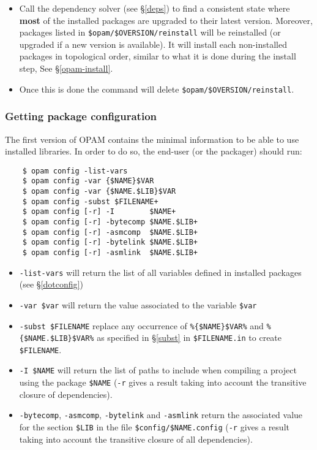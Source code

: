 \documentclass[a4paper,11pt]{article}
\begin{document}
\begin{itemize}

\item Call the dependency solver (see \S\ref{deps}) to
find a consistent state where {\bf most} of the installed packages are
upgraded to their latest version. Moreover, packages listed in
\verb+$opam/$OVERSION/reinstall+ will be reinstalled (or upgraded if a new
version is available). It will install each non-installed packages in
topological order, similar to what it is done during the install step,
See \S\ref{opam-install}.

\item Once this is done the command will delete
  \verb+$opam/$OVERSION/reinstall+.

\end{itemize}

\subsubsection{Getting package configuration}
\label{opam-config}

The first version of OPAM contains the minimal information to be able
to use installed libraries. In order to do so, the end-user (or the
packager) should run:

\begin{verbatim}
    $ opam config -list-vars
    $ opam config -var {$NAME}$VAR
    $ opam config -var {$NAME.$LIB}$VAR
    $ opam config -subst $FILENAME+
    $ opam config [-r] -I        $NAME+
    $ opam config [-r] -bytecomp $NAME.$LIB+
    $ opam config [-r] -asmcomp  $NAME.$LIB+
    $ opam config [-r] -bytelink $NAME.$LIB+
    $ opam config [-r] -asmlink  $NAME.$LIB+
\end{verbatim}

\begin{itemize}
\item \verb+-list-vars+ will return the list of all variables defined
  in installed packages (see \S\ref{dotconfig})
\item \verb+-var $var+ will return the value associated to the
  variable \verb+$var+
\item \verb+-subst $FILENAME+ replace any occurrence of
  \verb+%{$NAME}$VAR%+ and \verb+%{$NAME.$LIB}$VAR%+ as specified in
  \S\ref{subst} in \verb+$FILENAME.in+ to create \verb+$FILENAME+.
\item \verb+-I $NAME+ will return the list of paths to include when
  compiling a project using the package \verb+$NAME+ (\verb+-r+ gives
  a result taking into account the transitive closure of
  dependencies).
\item \verb+-bytecomp+, \verb+-asmcomp+, \verb+-bytelink+ and
  \verb+-asmlink+ return the associated value for the section
  \verb+$LIB+ in the file \verb+$config/$NAME.config+ (\verb+-r+ gives
  a result taking into account the transitive closure of all
  dependencies).
\end{itemize}
\end{document}
